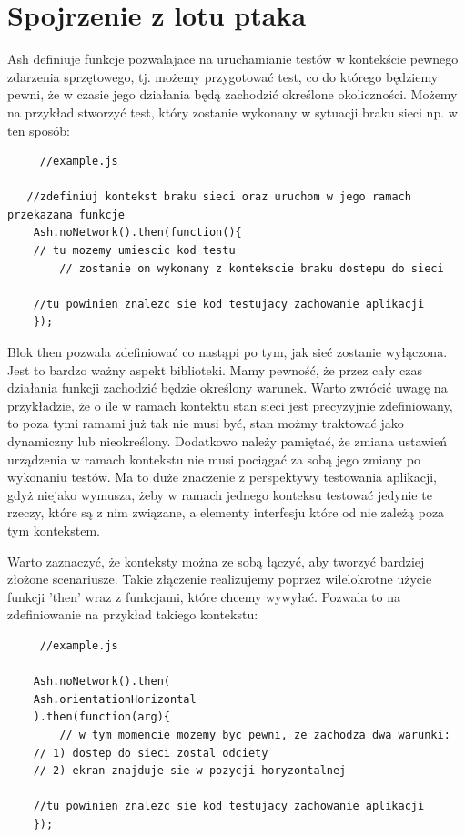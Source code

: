 \documentclass[brudnopis]{xmgr}
\begin{document}
\section{Spojrzenie z lotu ptaka}

Ash definiuje funkcje pozwalajace na uruchamianie testów w kontekście pewnego zdarzenia sprzętowego, tj. możemy przygotować test, co do którego będziemy pewni, że w czasie jego działania będą zachodzić określone okoliczności. Możemy na przykład stworzyć test, który zostanie wykonany w sytuacji braku sieci np. w ten sposób:

\begin{lstlisting}
     //example.js

   //zdefiniuj kontekst braku sieci oraz uruchom w jego ramach przekazana funkcje
    Ash.noNetwork().then(function(){
	// tu mozemy umiescic kod testu
     	// zostanie on wykonany z kontekscie braku dostepu do sieci

	//tu powinien znalezc sie kod testujacy zachowanie aplikacji 
    });
\end{lstlisting}

Blok then pozwala zdefiniować co nastąpi po tym, jak sieć zostanie wyłączona. Jest to bardzo ważny aspekt biblioteki. Mamy pewność, że przez cały czas działania funkcji zachodzić będzie określony warunek. Warto zwrócić uwagę na przykładzie, że o ile w ramach kontektu stan sieci jest precyzyjnie zdefiniowany, to poza tymi ramami już tak nie musi być, stan możmy traktować jako dynamiczny lub nieokreślony. Dodatkowo należy pamiętać, że zmiana ustawień urządzenia w ramach kontekstu nie musi pociągać za sobą jego zmiany po wykonaniu testów. Ma to duże znaczenie z perspektywy testowania aplikacji, gdyż niejako wymusza, żeby w ramach jednego konteksu testować jedynie te rzeczy, które są z nim związane, a elementy interfesju które od nie zależą poza tym kontekstem.

Warto zaznaczyć, że konteksty można ze sobą łączyć, aby tworzyć bardziej złożone scenariusze. Takie złączenie realizujemy poprzez wilelokrotne użycie funkcji 'then' wraz z funkcjami, które chcemy wywyłać. Pozwala to na zdefiniowanie na przykład takiego kontekstu:

\begin{lstlisting}
     //example.js

    Ash.noNetwork().then(
	Ash.orientationHorizontal
    ).then(function(arg){
      	// w tym momencie mozemy byc pewni, ze zachodza dwa warunki:
	// 1) dostep do sieci zostal odciety 
	// 2) ekran znajduje sie w pozycji horyzontalnej

	//tu powinien znalezc sie kod testujacy zachowanie aplikacji 
    });
\end{lstlisting}
\end{document}
